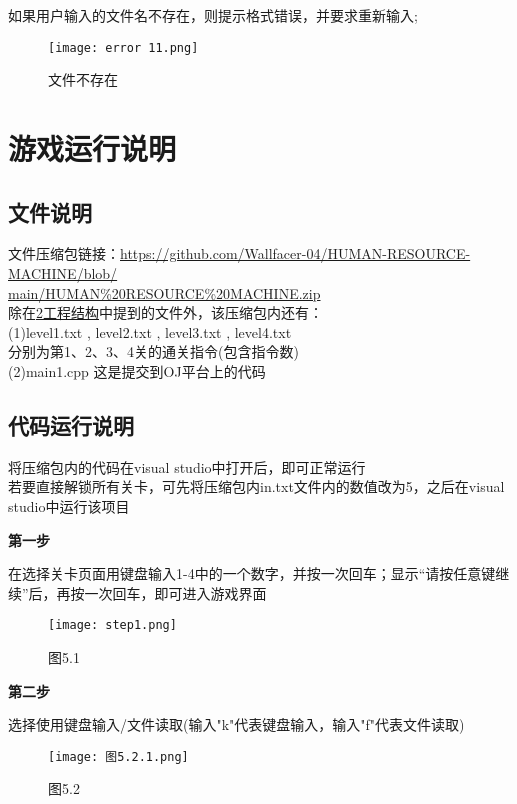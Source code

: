 \documentclass{report}
\begin{document}
    如果用户输入的文件名不存在，则提示格式错误，并要求重新输入;\\
    \begin{figure}[htbp]
        \centering
        \texttt{[image: error 11.png]}
        \caption*{文件不存在}
    \end{figure}
            

    \chapter{游戏运行说明}
    \section{文件说明}\noindent
    文件压缩包链接：\;\href{https://github.com/Wallfacer-04/HUMAN-RESOURCE-MACHINE/blob/main/HUMAN%20RESOURCE%20MACHINE.zip}{https://github.com/Wallfacer-04/HUMAN-RESOURCE-MACHINE/blob/\\\hspace*{8em}main/HUMAN\%20RESOURCE\%20MACHINE.zip}\vspace{0.5em}\\
    除在\;\hyperref[chap-2]{2\;工程结构}\;中提到的文件外，该压缩包内还有：\\
    (1)\;level1.txt \;,\; level2.txt \;,\; level3.txt \;,\; level4.txt \\
    \hspace*{1em} 分别为第1、2、3、4关的通关指令(包含指令数) \vspace{0.1em}\\
    (2)\;main1.cpp \quad 这是提交到OJ平台上的代码

    \section{代码运行说明}\noindent
    将压缩包内的代码在visual studio中打开后，即可正常运行\\
    若要直接解锁所有关卡，可先将压缩包内in.txt文件内的数值改为5，之后在visual studio中运行该项目\vspace{0.5em}\par
    \textbf{第一步}\par
    在选择关卡页面用键盘输入1-4中的一个数字，并按一次回车；显示“请按任意键继续”后，再按一次回车，即可进入游戏界面
    \begin{figure}[htbp]
        \centering
        \texttt{[image: step1.png]}
        \caption*{图5.1}
    \end{figure}\newpage
    \textbf{第二步}\par
    选择使用键盘输入/文件读取(输入"k"代表键盘输入，输入"f"代表文件读取)
    \begin{figure}[htbp]
        \centering
        \texttt{[image: 图5.2.1.png]}
        \caption*{图5.2}
    \end{figure}\par
\end{document}

